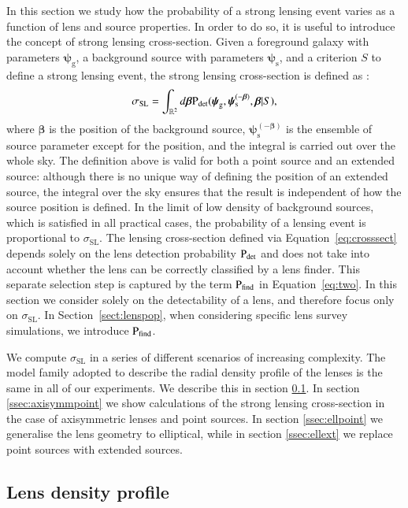 \documentclass{aa}
\def\psilens{\boldsymbol{\psi}_\mathrm{g}}
\def\psisource{\boldsymbol{\psi}_\mathrm{s}}
\def\psisourcenobeta{\boldsymbol{\psi}_\mathrm{s}^{(-\boldsymbol\beta)}}
\def\pdet{{\rm P}_\mathrm{det}}
\def\pfind{{\rm P}_\mathrm{find}}
\def\crosssect{\sigma_\mathrm{{SL}}}
\def\Sref#1{Section~\ref{#1}\xspace}
\def\Eref#1{Equation~\ref{#1}\xspace}
\begin{document}
In this section we study how the probability of a strong lensing event varies as a function of lens and source properties.
In order to do so, it is useful to introduce the concept of strong lensing cross-section.
Given a foreground galaxy with parameters $\psilens$, a background source with parameters $\psisource$, and a criterion $S$ to define a strong lensing event, the strong lensing cross-section is defined as \citep{Son22}:
\begin{equation}\label{eq:crosssect}
\crosssect = \int_{\mathbb{R}^2} d\boldsymbol\beta \pdet(\psilens,\psisourcenobeta,\boldsymbol\beta|S),
\end{equation}
where $\boldsymbol\beta$ is the position of the background source, $\psisourcenobeta$ is the ensemble of source parameter except for the position, and the integral is carried out over the whole sky.
The definition above is valid for both a point source and an extended source: although there is no unique way of defining the position of an extended source, the integral over the sky ensures that the result is independent of how the source position is defined.
In the limit of low density of background sources, which is satisfied in all practical cases, the probability of a lensing event is proportional to $\crosssect$.
The lensing cross-section defined via \Eref{eq:crosssect} depends solely on the lens detection probability $\pdet$ and does not take into account whether the lens can be correctly classified by a lens finder.
This separate selection step is captured by the term $\pfind$ in \Eref{eq:two}.
In this section we consider solely on the detectability of a lens, and therefore focus only on $\crosssect$. In \Sref{sect:lenspop}, when considering specific lens survey simulations, we introduce $\pfind$.

We compute $\crosssect$ in a series of different scenarios of increasing complexity.
The model family adopted to describe the radial density profile of the lenses is the same in all of our experiments. We describe this in section \ref{ssec:profile}.
In section \ref{ssec:axisymmpoint} we show calculations of the strong lensing cross-section in the case of axisymmetric lenses and point sources.
In section \ref{ssec:ellpoint} we generalise the lens geometry to elliptical, while in section \ref{ssec:ellext} we replace point sources with extended sources.


\subsection{Lens density profile}\label{ssec:profile}
\end{document}
